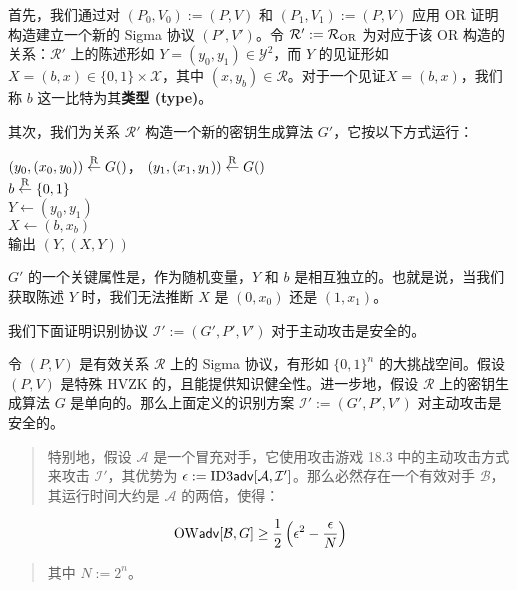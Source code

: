 首先，我们通过对 $(P_0,V_0):=(P,V)$ 和 $(P_1,V_1):=(P,V)$ 应用 OR 证明构造建立一个新的 Sigma 协议 $(P',V')$。令 $\mathcal{R}':=\mathcal{R}_{\rm OR}$ 为对应于该 OR 构造的关系：$\mathcal{R}'$ 上的陈述形如 $Y=(y_0,y_1)\in\mathcal{Y}^2$，而 $Y$ 的见证形如 $X=(b,x)\in\{0,1\}\times\mathcal{X}$，其中 $(x,y_b)\in\mathcal{R}$。对于一个见证$X = (b,x)$，我们称 $b$ 这一比特为其\textbf{类型 (type)}。

其次，我们为关系 $\mathcal{R}'$ 构造一个新的密钥生成算法 $G'$，它按以下方式运行：

\vspace{8pt}

\hspace*{40pt} $(y_0,(x_0,y_0))\overset{\rm R}\leftarrow G()$，
               $(y_1,(x_1,y_1))\overset{\rm R}\leftarrow G()$\\
\hspace*{62pt} $b\overset{\rm R}\leftarrow\{0,1\}$\\
\hspace*{62pt} $Y\leftarrow(y_0,y_1)$\\
\hspace*{62pt} $X\leftarrow(b,x_b)$\\
\hspace*{62pt} 输出 $(Y,(X,Y))$

\vspace{8pt}

\noindent
$G'$ 的一个关键属性是，作为随机变量，$Y$ 和 $b$ 是相互独立的。也就是说，当我们获取陈述 $Y$ 时，我们无法推断 $X$ 是 $(0,x_0)$ 还是 $(1,x_1)$。

我们下面证明识别协议 $\mathcal{I}':=(G',P',V')$ 对于主动攻击是安全的。

\begin{theorem}\label{theo:19-22}
令 $(P,V)$ 是有效关系 $\mathcal{R}$ 上的 Sigma 协议，有形如 $\{0,1\}^n$ 的大挑战空间。假设 $(P,V)$ 是特殊 HVZK 的，且能提供知识健全性。进一步地，假设 $\mathcal{R}$ 上的密钥生成算法 $G$ 是单向的。那么上面定义的识别方案 $\mathcal{I}':=(G',P',V')$ 对主动攻击是安全的。
\begin{quote}
特别地，假设 $\mathcal{A}$ 是一个冒充对手，它使用攻击游戏 18.3 中的主动攻击方式来攻击 $\mathcal{I}'$，其优势为 $\epsilon:={\rm ID3\mathsf{adv}}[\mathcal{A},\mathcal{I}']$。那么必然存在一个有效对手 $\mathcal{B}$，其运行时间大约是 $\mathcal{A}$ 的两倍，使得：
\end{quote}
\[
{\rm OW\mathsf{adv}}[\mathcal{B},G]\geq\frac{1}{2}\left(\epsilon^2-\frac{\epsilon}{N}\right)
\]
\begin{quote}
其中 $N:=2^n$。
\end{quote}
\end{theorem}

